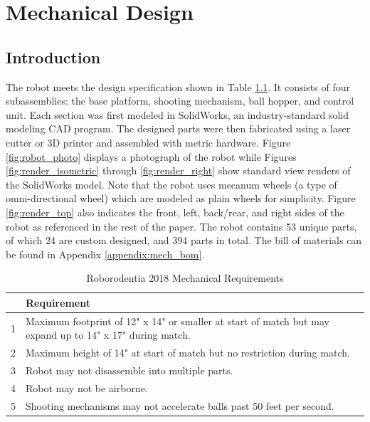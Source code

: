 \chapter{Mechanical Design}
\section{Introduction}
The robot meets the design specification shown in Table \ref{tab:roborodentia_reqs}. It consists of four subassemblies: the base platform, shooting mechanism, ball hopper, and control unit. Each section was first modeled in SolidWorks, an industry-standard solid modeling CAD program. The designed parts were then fabricated using a laser cutter or 3D printer and assembled with metric hardware. Figure \ref{fig:robot_photo} displays a photograph of the robot while Figures \ref{fig:render_isometric} through \ref{fig:render_right} show standard view renders of the SolidWorks model. Note that the robot uses mecanum wheels (a type of omni-directional wheel) which are modeled as plain wheels for simplicity. Figure \ref{fig:render_top} also indicates the front, left, back/rear, and right sides of the robot as referenced in the rest of the paper.  The robot contains 53 unique parts, of which 24 are custom designed, and 394 parts in total. The bill of materials can be found in Appendix \ref{appendix:mech_bom}.

\begin{table}[h]
	\centering	\caption{Roborodentia 2018 Mechanical Requirements}
	\begin{tabular}{cp{5in}}
		\hline 
		& Requirement \\ 
		\hline 
		1 & \ssp Maximum footprint of 12" x 14" or smaller at start of match but may expand up to 14" x 17" during match. \\ 
		\hline 
		2 & \ssp Maximum height of 14" at start of match but no restriction during match. \\ 
		\hline 
		3 & Robot may not disassemble into multiple parts. \\ 
		\hline 
		4 & Robot may not be airborne. \\ 
		\hline 
		5 & Shooting mechanisms may not accelerate balls past 50 feet per second. \\ 
		\hline 
	\end{tabular} 
	\label{tab:roborodentia_reqs}
\end{table}

